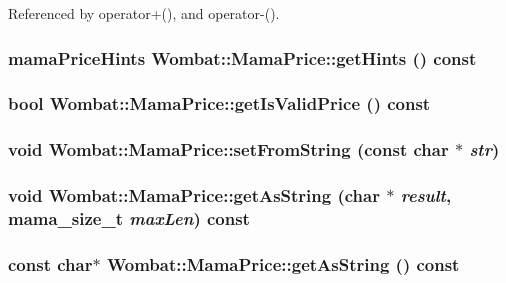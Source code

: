 Referenced by operator+(), and operator-\/().\hypertarget{classWombat_1_1MamaPrice_a65d2a44d341047e339d10e922ce0d43c}{
\subsubsection[{getHints}]{\setlength{\rightskip}{0pt plus 5cm}mamaPriceHints Wombat::MamaPrice::getHints () const}}
\label{classWombat_1_1MamaPrice_a65d2a44d341047e339d10e922ce0d43c}
\hypertarget{classWombat_1_1MamaPrice_a9b6bcdbc3e69fac28c6404866282c3cd}{
\subsubsection[{getIsValidPrice}]{\setlength{\rightskip}{0pt plus 5cm}bool Wombat::MamaPrice::getIsValidPrice () const}}
\label{classWombat_1_1MamaPrice_a9b6bcdbc3e69fac28c6404866282c3cd}
\hypertarget{classWombat_1_1MamaPrice_a3a4de871f54d57126894d90c2d51f7bb}{
\subsubsection[{setFromString}]{\setlength{\rightskip}{0pt plus 5cm}void Wombat::MamaPrice::setFromString (const char $\ast$ {\em str})}}
\label{classWombat_1_1MamaPrice_a3a4de871f54d57126894d90c2d51f7bb}
\hypertarget{classWombat_1_1MamaPrice_ae735ce0fedcead944050df2460ef33a0}{
\subsubsection[{getAsString}]{\setlength{\rightskip}{0pt plus 5cm}void Wombat::MamaPrice::getAsString (char $\ast$ {\em result}, \/  {\bf mama\_\-size\_\-t} {\em maxLen}) const}}
\label{classWombat_1_1MamaPrice_ae735ce0fedcead944050df2460ef33a0}
\hypertarget{classWombat_1_1MamaPrice_afc70ff08184de27cac8f656d6878f702}{
\subsubsection[{getAsString}]{\setlength{\rightskip}{0pt plus 5cm}const char$\ast$ Wombat::MamaPrice::getAsString () const}}
\label{classWombat_1_1MamaPrice_afc70ff08184de27cac8f656d6878f702}


